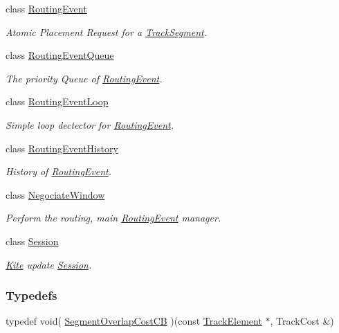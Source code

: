 \begin{DoxyCompactItemize}
class \hyperlink{classKite_1_1RoutingEvent}{Routing\-Event}
\begin{DoxyCompactList}\small\item\em Atomic Placement Request for a \hyperlink{classKite_1_1TrackSegment}{Track\-Segment}. \end{DoxyCompactList}\item 
class \hyperlink{classKite_1_1RoutingEventQueue}{Routing\-Event\-Queue}
\begin{DoxyCompactList}\small\item\em The priority Queue of \hyperlink{classKite_1_1RoutingEvent}{Routing\-Event}. \end{DoxyCompactList}\item 
class \hyperlink{classKite_1_1RoutingEventLoop}{Routing\-Event\-Loop}
\begin{DoxyCompactList}\small\item\em Simple loop dectector for \hyperlink{classKite_1_1RoutingEvent}{Routing\-Event}. \end{DoxyCompactList}\item 
class \hyperlink{classKite_1_1RoutingEventHistory}{Routing\-Event\-History}
\begin{DoxyCompactList}\small\item\em History of \hyperlink{classKite_1_1RoutingEvent}{Routing\-Event}. \end{DoxyCompactList}\item 
class \hyperlink{classKite_1_1NegociateWindow}{Negociate\-Window}
\begin{DoxyCompactList}\small\item\em Perform the routing, main \hyperlink{classKite_1_1RoutingEvent}{Routing\-Event} manager. \end{DoxyCompactList}\item 
class \hyperlink{classKite_1_1Session}{Session}
\begin{DoxyCompactList}\small\item\em \hyperlink{namespaceKite}{Kite} update \hyperlink{classKite_1_1Session}{Session}. \end{DoxyCompactList}\end{DoxyCompactItemize}
\subsubsection*{Typedefs}
\begin{DoxyCompactItemize}
\item 
typedef void( \hyperlink{namespaceKite_aa5bc3df660243357cdf8639f57d4a41b}{Segment\-Overlap\-Cost\-C\-B} )(const \hyperlink{classKite_1_1TrackElement}{Track\-Element} $\ast$, Track\-Cost \&)
\end{DoxyCompactItemize}
